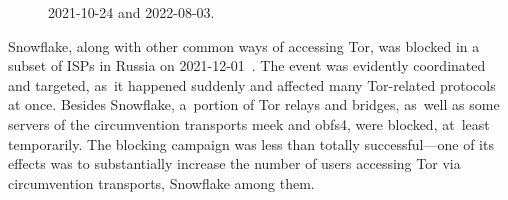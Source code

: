 \documentclass[letterpaper,twocolumn]{article}
\begin{document}
\begin{figure}
{\begin{minipage}[b][\textheight][b]{\linewidth}
{%
\mbox{2021-10-24} and \mbox{2022-08-03}.
\label{fig:client-counts-tm}
}
\end{minipage}}
\end{figure}


Snowflake, along with other common ways of accessing Tor,
was blocked in a subset of ISPs in Russia
on \mbox{2021-12-01}~\cite{ooni-2021-russia-blocks-tor}.
The event was evidently coordinated and targeted,
as~it happened suddenly and affected many Tor-related protocols at once.
Besides Snowflake,
a~portion of Tor relays and bridges,
as~well as some servers of
the circumvention transports meek and obfs4,
were blocked, at~least temporarily.
The blocking campaign was
less than totally successful---one
of its effects was to substantially increase the number
of users accessing Tor via circumvention transports,
Snowflake among them.
\end{document}
